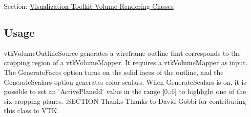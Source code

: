Section\-: \hyperlink{sec_vtkvolumerendering}{Visualization Toolkit Volume Rendering Classes} \hypertarget{vtkwidgets_vtkxyplotwidget_Usage}{}\subsection{Usage}\label{vtkwidgets_vtkxyplotwidget_Usage}
vtk\-Volume\-Outline\-Source generates a wireframe outline that corresponds to the cropping region of a vtk\-Volume\-Mapper. It requires a vtk\-Volume\-Mapper as input. The Generate\-Faces option turns on the solid faces of the outline, and the Generate\-Scalars option generates color scalars. When Generate\-Scalars is on, it is possible to set an \char`\"{}\-Active\-Plane\-Id\char`\"{} value in the range \mbox{[}0..6\mbox{]} to highlight one of the six cropping planes. .S\-E\-C\-T\-I\-O\-N Thanks Thanks to David Gobbi for contributing this class to V\-T\-K.

